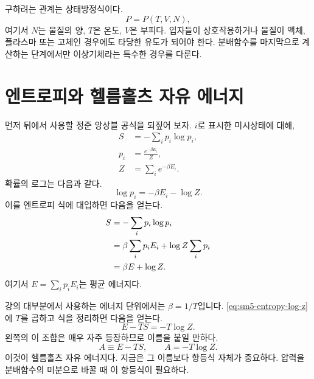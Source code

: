 구하려는 관계는 상태방정식이다.
\begin{equation}
 P=P(T,V,N),
 \label{eq:sm5-equation-of-state-target}
\end{equation}
여기서 \(N\)는 물질의 양, \(T\)은 온도, \(V\)은 부피다. 입자들이 상호작용하거나 물질이 액체, 플라스마 또는 고체인 경우에도 타당한 유도가 되어야 한다. 분배함수를 마지막으로 계산하는 단계에서만 이상기체라는 특수한 경우를 다룬다.

\section{엔트로피와 헬름홀츠 자유 에너지}

먼저 뒤에서 사용할 정준 앙상블 공식을 되짚어 보자. \(i\)로 표시한 미시상태에 대해,
\begin{equation}
 \begin{aligned}
 S&=-\sum_i p_i\log p_i,\\
 p_i&=\frac{e^{-\beta E_i}}{Z},\\
 Z&=\sum_i e^{-\beta E_i}.
 \end{aligned}
 \label{eq:sm5-canonical-definitions}
\end{equation}
확률의 로그는 다음과 같다.
\begin{equation}
 \log p_i=-\beta E_i-\log Z.
 \label{eq:sm5-log-probability}
\end{equation}
이를 엔트로피 식에 대입하면 다음을 얻는다.
\begin{align}
 S
 &=-\sum_i p_i\log p_i \notag\\
 &=\beta\sum_i p_iE_i+\log Z\sum_i p_i \notag\\
 &=\beta E+\log Z.
 \label{eq:sm5-entropy-log-z}
\end{align}
여기서 \(E=\sum_i p_iE_i\)는 평균 에너지다.

\begin{classroomqa}
\end{classroomqa}

강의 대부분에서 사용하는 에너지 단위에서는
\(\beta=1/T\)입니다. \eqref{eq:sm5-entropy-log-z}에 \(T\)를 곱하고 식을 정리하면 다음을 얻는다.
\begin{equation}
 E-TS=-T\log Z.
 \label{eq:sm5-helmholtz-identity}
\end{equation}
왼쪽의 이 조합은 매우 자주 등장하므로 이름을 붙일 만하다.
\begin{equation}
 A\equiv E-TS,
 \qquad
 A=-T\log Z.
 \label{eq:sm5-helmholtz-definition}
\end{equation}
이것이 헬름홀츠 자유 에너지다. 지금은 그 이름보다 항등식 자체가 중요하다. 압력을 분배함수의 미분으로 바꿀 때 이 항등식이 필요하다.

